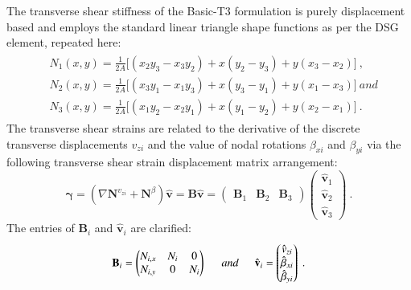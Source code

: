 The transverse shear stiffness of the Basic-T3 formulation is purely displacement based and employs the standard linear triangle shape functions as per the DSG element, repeated here:
\begin{gather} 
\begin{aligned}
&N_1 (x , y) = \frac{1}{2 A} \big[ (x_2 y_3 - x_3 y_2) + x(y_2 - y_3) + y(x_3 - x_2) \big]\ ,
\\
&N_2 (x , y) = \frac{1}{2 A} \big[ (x_3 y_1 - x_1 y_3) + x(y_3 - y_1) + y(x_1 - x_3) \big]\  and
\\
&N_3 (x , y) = \frac{1}{2 A} \big[ (x_1 y_2 - x_2 y_1) + x(y_1 - y_2) + y(x_2 - x_1) \big]
\label{eqApp2_1}\ .
\end{aligned}
\end{gather}
The transverse shear strains are related to the derivative of the discrete transverse displacements $v_{zi}$ and the value of nodal rotations $\beta_{xi}$ and $\beta_{yi}$ via the following transverse shear strain displacement matrix arrangement:
\begin{equation}
\boldsymbol{\gamma} = (\nabla \mathbf{N}^{v_{zi}} + \mathbf{N}^{\beta} ) \hat{\mathbf{v}} 
= \mathbf{B} \hat{\mathbf{v}}  = 
\begin{pmatrix}
\mathbf{B}_1 & \mathbf{B}_2 & \mathbf{B}_3 
\end{pmatrix}
\begin{pmatrix}
\hat{\mathbf{v}}_1 \\
 \hat{\mathbf{v}}_2 \\
  \hat{\mathbf{v}}_3 
\end{pmatrix}
\label{eqApp2_2}\ .
\end{equation}
The entries of $\mathbf{B}_i$ and $\hat{\mathbf{v}}_i $ are clarified:
\begin{equation}
\mathbf{B}_i=  \begin{pmatrix}
{N}_{i,x} & {N}_i & 0\\
{N}_{i,y} & 0 & {N}_i 
\end{pmatrix}
\hspace{5mm}
and
\hspace{5mm}
\hat{\mathbf{v}}_i =  \begin{pmatrix}
\hat{v}_{zi}\\
\hat{\beta}_{xi}\\
\hat{\beta}_{yi}
\end{pmatrix}
\label{eqApp2_3}\ .
\end{equation}